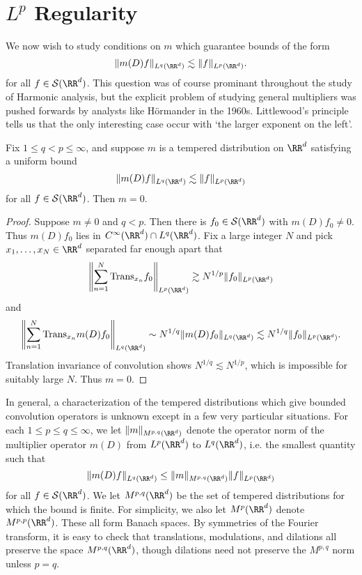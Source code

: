 \section{$L^p$ Regularity}

We now wish to study conditions on $m$ which guarantee bounds of the form
%
\[ \| m(D) f \|_{L^q(\RR^d)} \lesssim \| f \|_{L^p(\RR^d)}. \]
%
for all $f \in \mathcal{S}(\RR^d)$. This question was of course prominant throughout the study of Harmonic analysis, but the explicit problem of studying general multipliers was pushed forwards by analysts like H\"{o}rmander in the 1960s. Littlewood's principle tells us that the only interesting case occur with `the larger exponent on the left'.

\begin{theorem}
  Fix $1 \leq q < p \leq \infty$, and suppose $m$ is a tempered distribution on $\RR^d$ satisfying a uniform bound
  \[ \| m(D) f \|_{L^q(\RR^d)} \lesssim \| f \|_{L^p(\RR^d)} \]
  for all $f \in \mathcal{S}(\RR^d)$. Then $m = 0$.
\end{theorem}
\begin{proof}
  Suppose $m \neq 0$ and $q < p$. Then there is $f_0 \in \mathcal{S}(\RR^d)$ with $m(D) f_0 \neq 0$. Thus $m(D) f_0$ lies in $C^\infty(\RR^d) \cap L^q(\RR^d)$. Fix a large integer $N$ and pick $x_1,\dots,x_N \in \RR^d$ separated far enough apart that
  \[ \left\| \sum_{n = 1}^N \text{Trans}_{x_n} f_0 \right\|_{L^p(\RR^d)} \gtrsim N^{1/p} \| f_0 \|_{L^p(\RR^d)} \]
  and
  \[ \left\| \sum_{n = 1}^N \text{Trans}_{x_n} m(D) f_0 \right\|_{L^q(\RR^d)} \sim N^{1/q} \| m(D) f_0 \|_{L^q(\RR^d)} \lesssim N^{1/q} \| f_0 \|_{L^p(\RR^d)}. \]
  Translation invariance of convolution shows $N^{1/q} \lesssim N^{1/p}$, which is impossible for suitably large $N$. Thus $m = 0$.
\end{proof}

In general, a characterization of the tempered distributions which give bounded convolution operators is unknown except in a few very particular situations. For each $1 \leq p \leq q \leq \infty$, we let $\| m \|_{M^{p,q}(\RR^d)}$ denote the operator norm of the multiplier operator $m(D)$ from $L^p(\RR^d)$ to $L^q(\RR^d)$, i.e. the smallest quantity such that
%
\[ \| m(D) f \|_{L^q(\RR^d)} \leq \| m \|_{M^{p,q}(\RR^d)} \| f \|_{L^p(\RR^d)} \]
%
for all $f \in \mathcal{S}(\RR^d)$. We let $M^{p,q}(\RR^d)$ be the set of tempered distributions for which the bound is finite. For simplicity, we also let $M^p(\RR^d)$ denote $M^{p,p}(\RR^d)$. These all form Banach spaces. By symmetries of the Fourier transform, it is easy to check that translations, modulations, and dilations all preserve the space $M^{p,q}(\RR^d)$, though dilations need not preserve the $M^{p,q}$ norm unless $p = q$.

